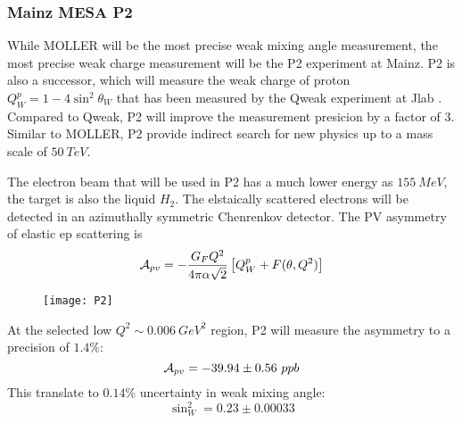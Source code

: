 \subsubsection{Mainz MESA P2}
While MOLLER will be the most precise weak mixing angle measurement, the most
precise weak charge measurement will be the P2 experiment at Mainz.
P2 is also a successor, which will measure the weak charge of proton $Q_W^p = 1 - 4\sin^2\theta_W$
that has been measured by the Qweak experiment at Jlab \cite{???}. Compared to
Qweak, P2 will improve the measurement presicion by a factor of 3.
Similar to MOLLER, P2 provide indirect search for new physics up to a mass scale
of $50\ TeV$.

The electron beam that will be used in P2 has a much lower energy as $155\ MeV$, 
the target is also the liquid $H_2$. The elstaically scattered electrons will
be detected in an azimuthally symmetric Chenrenkov detector. The PV asymmetry
of elastic ep scattering is
\begin{equation}
    \mathcal{A}_{pv} = -\frac{G_F Q^2}{4\pi\alpha\sqrt{2}} \left[ Q_W^p + F(\theta, Q^2) \right]
\end{equation}
\begin{figure}
    \centering
    \texttt{[image: P2]}
\end{figure}
At the selected low $Q^2 \sim 0.006 \ GeV^2$ region, P2 will measure the asymmetry
to a precision of $1.4\%$:
\begin{equation}
    \mathcal{A}_{pv} = -39.94 \pm 0.56\ ppb
\end{equation}
This translate to $0.14\%$ uncertainty in weak mixing angle:
\begin{equation}
    \sin^2_W = 0.23 \pm 0.00033
\end{equation}
